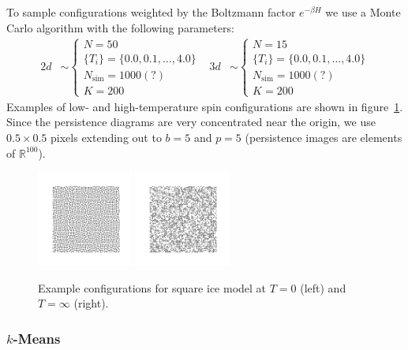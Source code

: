 \documentclass[11pt]{article}
\begin{document}
To sample configurations weighted by the Boltzmann factor $e^{-\beta H}$ we use a Monte Carlo algorithm with the following parameters:
\begin{align}
    2d&\sim\left\{\begin{array}{l}
        N = 50\\
        \{T_i\} = \{0.0,0.1,\ldots,4.0\}\\
        N_\text{sim} = 1000(?)\\
        K = 200
    \end{array}\right. & 3d&\sim\left\{\begin{array}{l}
        N = 15\\
        \{T_i\} = \{0.0,0.1,\ldots,4.0\}\\
        N_\text{sim} = 1000(?)\\
        K = 200
    \end{array}\right.
\end{align}
Examples of low- and high-temperature spin configurations are shown in figure~\ref{fig:SquareiceExampleConfigs}. Since the persistence diagrams are very concentrated near the origin, we use $0.5\times0.5$ pixels extending out to $b=5$ and $p=5$ (persistence images are elements of $\mathbb{R}^{100}$).

\begin{figure}[h]
    \centering
    \includegraphics[width=0.28\textwidth]{squareice_images/squareice_T=0.png}
    \includegraphics[width=0.28\textwidth]{squareice_images/squareice_T=inf.png}
    \caption{Example configurations for square ice model at $T=0$ (left) and $T=\infty$ (right).}
    \label{fig:SquareiceExampleConfigs}
\end{figure}

\newpage
\subsubsection{$k$-Means}
\end{document}
